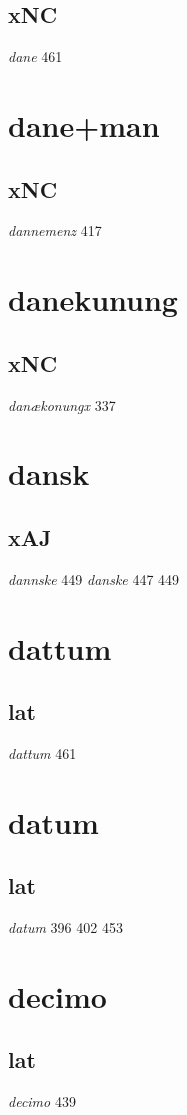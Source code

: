 \documentclass[a4paper,twocolumn]{article}
\begin{document}
\subsection{xNC}
\label{sec:org900c6b4}
\emph{dane} 461 
\section{dane+man}
\label{sec:orgce9c8a9}
\subsection{xNC}
\label{sec:orgae5e4f5}
\emph{dannemenz} 417 
\section{danekunung}
\label{sec:org71db8d6}
\subsection{xNC}
\label{sec:org995992b}
\emph{danækonungx} 337 
\section{dansk}
\label{sec:org250bd9b}
\subsection{xAJ}
\label{sec:org848780a}
\emph{dannske} 449 \emph{danske} 447 449 
\section{dattum}
\label{sec:org70ca8b6}
\subsection{lat}
\label{sec:orgb210af4}
\emph{dattum} 461 
\section{datum}
\label{sec:orgc851800}
\subsection{lat}
\label{sec:orgdc07e69}
\emph{datum} 396 402 453 
\section{decimo}
\label{sec:org5263920}
\subsection{lat}
\label{sec:orgb2b21f8}
\emph{decimo} 439 
\end{document}
